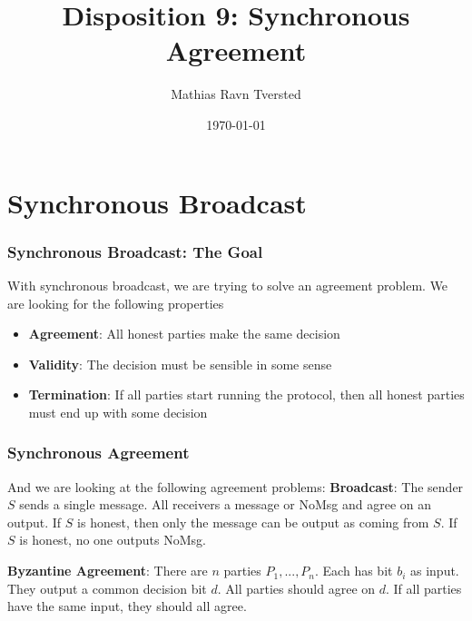 
\title{Disposition 9: Synchronous Agreement}   
\author{Mathias Ravn Tversted} 
\date{\today} 












\frame{\titlepage}



\section{Synchronous Broadcast}
    \begin{frame}
        \frametitle{Synchronous Broadcast: The Goal}
            With synchronous broadcast, we are trying to solve an agreement problem. We are looking for the following properties
            \begin{itemize}
                \item \textbf{Agreement}: All honest parties make the same decision
                \item \textbf{Validity}: The decision must be sensible in some sense
                \item \textbf{Termination}: If all parties start running the protocol, then all honest parties must end up with some decision
            \end{itemize}
    \end{frame}
\begin{frame}
    \frametitle{Synchronous Agreement}  
        And we are looking at the following agreement problems: 
        \textbf{Broadcast}: The sender $S$ sends a single message. All receivers a message or NoMsg and agree on an output. If $S$ is honest, then only the message can be output as coming from $S$. If $S$ is honest, no one outputs NoMsg. 
        
        \textbf{Byzantine Agreement}: There are $n$ parties $P_1, ..., P_n$. Each has bit $b_i$ as input. They output a common decision bit $d$. All parties should agree on $d$. If all parties have the same input, they should all agree. 
\end{frame}


